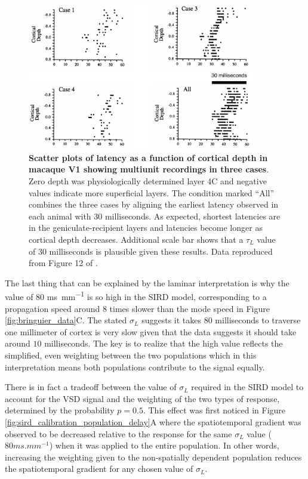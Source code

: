 \documentclass[phd,ianc,twoside]{infthesis}
\begin{document}
\begin{figure}
  \center
  \includegraphics[width=0.9\textwidth]{./figures/maunsell_laminar.pdf}
\caption{{\bf Scatter plots of latency as a function of cortical depth in
    macaque V1 showing multiunit recordings in three cases}. Zero depth
  was physiologically determined layer 4C and negative values indicate
  more superficial layers. The condition marked ``All'' combines the three
  cases by aligning the earliest latency observed in each animal with
  $30$ milliseconds. As expected, shortest latencies are in the
  geniculate-recipient layers and latencies become longer as cortical
  depth decreases.  Additional scale bar shows that a $\tau_L$ value of
  $30$ milliseconds is plausible given these results. Data reproduced
  from Figure 12 of \citet{maunsell_jneurophys92}.}
\label{fig:maunsell_laminar}
\end{figure}


The last thing that can be explained by the laminar interpretation is
why the value of $80$ \si{ms.mm^{-1}} is so high in the SIRD model,
corresponding to a propagation speed around $8$ times slower than the
mode speed in Figure \ref{fig:bringuier_data}C. The stated $\sigma_L$
suggests it takes $80$ milliseconds to traverse one millimeter of cortex
is very slow given that the data suggests it should take around $10$
milliseconds. The key is to realize that the high value reflects the
simplified, even weighting between the two populations which in this
interpretation means both populations contribute to the signal equally.

There is in fact a tradeoff between the value of $\sigma_L$ required in
the SIRD model to account for the VSD signal and the weighting of the
two types of response, determined by the probability $p=0.5$.  This
effect was first noticed in Figure
\ref{fig:sird_calibration_population_delay}A where the spatiotemporal
gradient was observed to be decreased relative to the response for the
same $\sigma_L$ value ($80 \si{ms.mm^{-1}}$) when it was applied to the
entire population. In other words, increasing the weighting given to the
non-spatially dependent population reduces the spatiotemporal gradient
for any chosen value of $\sigma_L$.
\end{document}
